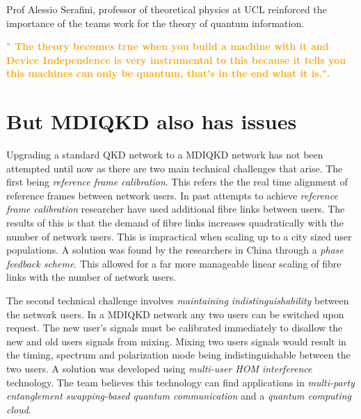 \documentclass[journal]{vgtc}
\begin{document}
\vspace{0.3cm}

\noindent Prof Alessio Serafini, professor of theoretical physics at UCL reinforced the importance of the teams work for the theory of quantum information.

\vspace{0.3cm}

\textcolor{orange}{\textbf{" The theory becomes true when you build a machine with it and Device Independence is very instrumental to this because it tells you this machines can only be quantum, that's in the end what it is.".}}

\section{But MDIQKD also has issues}

Upgrading a standard QKD network to a MDIQKD network has not been attempted until now as there are two main technical challenges that arise. The first being \textit{reference frame calibration}. This refers the the real time alignment of reference frames between network users. In past attempts to achieve \textit{reference frame calibration} researcher have used additional fibre links between users. The results of this is that the demand of fibre links increases quadratically with the number of network users. This is impractical when scaling up to a city sized user populations. A solution was found by the researchers in China through a \textit{phase feedback scheme}. This allowed for a far more manageable linear scaling of fibre links with the number of network users.

The second technical challenge involves \textit{maintaining indistinguishability} between the network users. In a MDIQKD network any two users can be switched upon request. The new user's signals must be calibrated immediately to disallow the new and old users signals from mixing. Mixing two users signals would result in the timing, spectrum and polarization mode being indistinguishable between the two users. A solution was developed using \textit{multi-user HOM interference} technology. The team believes this technology can find applications in \textit{multi-party entanglement swapping-based quantum communication} and a \textit{quantum computing cloud}.
\end{document}
